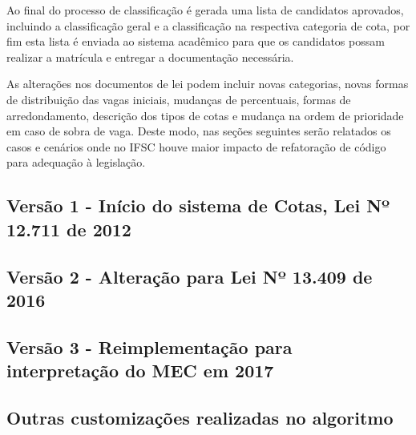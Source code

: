 Ao final do processo de classificação é gerada uma lista de candidatos aprovados, incluindo a classificação geral e a classificação na respectiva categoria de cota, por fim esta lista é enviada ao sistema acadêmico para que os candidatos possam realizar a matrícula e entregar a documentação necessária. 

As alterações nos documentos de lei podem incluir novas categorias, novas formas de distribuição das vagas iniciais, mudanças de percentuais, formas de arredondamento, descrição dos tipos de cotas e mudança na ordem de prioridade em caso de sobra de vaga. Deste modo, nas seções seguintes serão relatados os casos e cenários onde no \gls{IFSC} houve maior impacto de refatoração de código para adequação à legislação.


\subsection{Versão 1 - Início do sistema de Cotas, Lei Nº 12.711 de 2012}
\label{versao1}

\subsection{Versão 2 - Alteração para Lei Nº 13.409 de 2016 }
\label{versao1}

\subsection{Versão 3 - Reimplementação para interpretação do MEC em 2017 }
\label{versao1}

\subsection{Outras customizações realizadas no algoritmo}
\label{versao1}